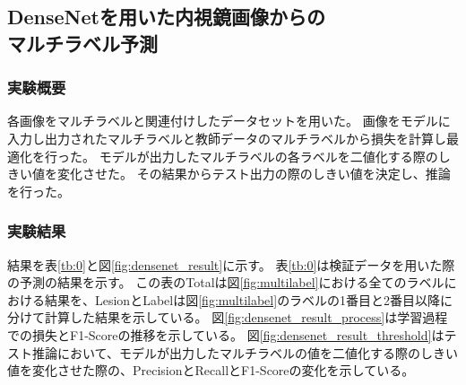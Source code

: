 \subsection{DenseNetを用いた内視鏡画像からの\\マルチラベル予測}
\subsubsection{実験概要}
各画像をマルチラベルと関連付けしたデータセットを用いた。
画像をモデルに入力し出力されたマルチラベルと教師データのマルチラベルから損失を計算し最適化を行った。
モデルが出力したマルチラベルの各ラベルを二値化する際のしきい値を変化させた。
その結果からテスト出力の際のしきい値を決定し、推論を行った。

\subsubsection{実験結果}
結果を表\ref{tb:0}と図\ref{fig:densenet_result}に示す。
表\ref{tb:0}は検証データを用いた際の予測の結果を示す。
この表のTotalは図\ref{fig:multilabel}における全てのラベルにおける結果を、LesionとLabelは図\ref{fig:multilabel}のラベルの1番目と2番目以降に分けて計算した結果を示している。
図\ref{fig:densenet_result_process}は学習過程での損失とF1-Scoreの推移を示している。
図\ref{fig:densenet_result_threshold}はテスト推論において、モデルが出力したマルチラベルの値を二値化する際のしきい値を変化させた際の、PrecisionとRecallとF1-Scoreの変化を示している。

